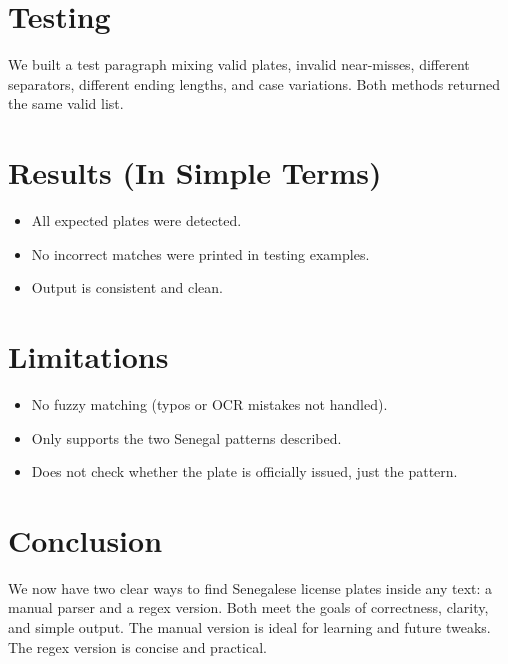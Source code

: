 \documentclass[12pt,a4paper]{article}
\begin{document}
\section{Testing}
We built a test paragraph mixing valid plates, invalid near-misses, different separators, different ending lengths, and case variations. Both methods returned the same valid list.

\section{Results (In Simple Terms)}
\begin{itemize}
    \item All expected plates were detected.
    \item No incorrect matches were printed in testing examples.
    \item Output is consistent and clean.
\end{itemize}

\section{Limitations}
\begin{itemize}
    \item No fuzzy matching (typos or OCR mistakes not handled).
    \item Only supports the two Senegal patterns described.
    \item Does not check whether the plate is officially issued, just the pattern.
\end{itemize}

\section{Conclusion}
We now have two clear ways to find Senegalese license plates inside any text: a manual parser and a regex version. Both meet the goals of correctness, clarity, and simple output. The manual version is ideal for learning and future tweaks. The regex version is concise and practical.
\end{document}
